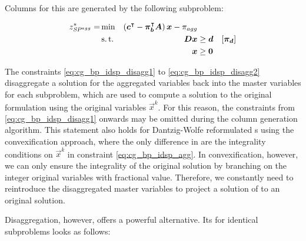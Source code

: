 Columns for this \MP{} are generated by the following subproblem:

\begin{equation}
\begin{aligned}
z^*_\SP{agg} = &\min & \left( \vec{c}\transpose - \vec{\pi}_\vec{b}\transpose \mat{A} \right) \vec{x} - \pi_{agg} & & \\
&\st & \mat{D} \vec{x} & \geq \vec{d} & \left[\vec{\pi}_\vec{d}\right] \\
&& \vec{x} & \geq \vec{0}
\end{aligned}
\end{equation}

The constraints \eqref{eq:cg_bp_idsp_disagg1} to \eqref{eq:cg_bp_idsp_disagg2} disaggregate a solution for the aggregated variables back into the master variables for each subproblem, which are used to compute a solution to the original formulation using the original variables $\vec{x}^k$. For this reason, the constraints from \eqref{eq:cg_bp_idsp_disagg1} onwards may be omitted during the column generation algorithm. This statement also holds for Dantzig-Wolfe reformulated \IP{}s using the convexification approach, where the only difference in \MP{} are the integrality conditions on $\vec{x}^k$ in constraint \eqref{eq:cg_bp_idsp_agg}. In convexification, however, we can only ensure the integrality of the original solution by branching on the integer original variables with fractional value. Therefore, we constantly need to reintroduce the disaggregated master variables to project a solution of \RMP{} to an original solution.

Disaggregation, however, offers a powerful alternative. Its \MP{} for identical subproblems looks as follows:

